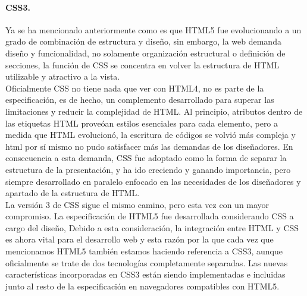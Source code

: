 \documentclass[12pt, a4paper, titlepage]{report}
\begin{document}
			\paragraph{CSS3.\\}
			Ya se ha mencionado anteriormente como es que HTML5 fue evolucionando a un grado de combinación de estructura y diseño, sin embargo, la web demanda diseño y funcionalidad, no solamente organización estructural o definición de secciones, la función de CSS se concentra en volver la estructura de HTML utilizable y atractivo a la vista.\\
			
			Oficialmente CSS no tiene nada que ver con HTML4, no es parte de la especificación, es de hecho, un complemento desarrollado para superar las limitaciones y reducir la complejidad de HTML. Al principio, atributos dentro de las etiquetas HTML proveóan estilos esenciales para cada elemento, pero a medida que HTML evolucionó, la escritura de códigos se volvió más compleja y html por sí mismo no pudo satisfacer más las demandas de los diseñadores. En consecuencia a esta demanda, CSS fue adoptado como la forma de separar la estructura de la presentación, y ha ido creciendo y ganando importancia, pero siempre desarrollado en paralelo enfocado en las necesidades de los diseñadores y apartado de la estructura de HTML.\\
			
			La versión 3 de CSS sigue el mismo camino, pero esta vez con un mayor compromiso. La especificación de HTML5 fue desarrollada considerando CSS a cargo del diseño, Debido a esta consideración, la integración entre HTML y CSS es ahora vital para el desarrollo web y esta razón por la que cada vez que mencionamos HTML5 también estamos haciendo referencia a CSS3, aunque oficialmente se trate de dos tecnologías completamente separadas. Las nuevas características incorporadas en CSS3 están siendo implementadas e incluidas junto al resto de la especificación en navegadores compatibles con HTML5. 
			\cite{refElGranLibro}%
			
\end{document}

